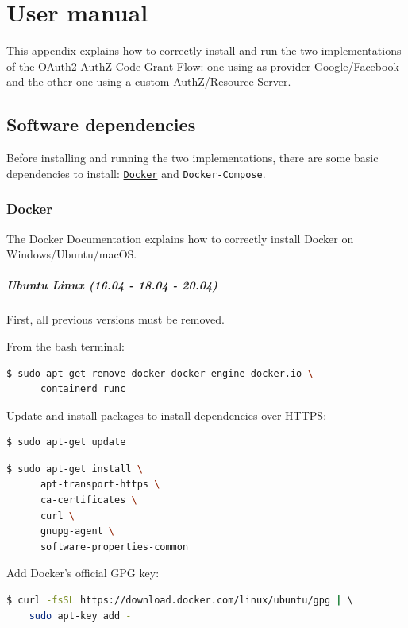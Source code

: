 \appendix
\chapter{User manual}
This appendix explains how to correctly install and run the two implementations of the OAuth2 AuthZ Code Grant Flow: one using as provider Google/Facebook and the other one using a custom AuthZ/Resource Server.

\minitoc

\section{Software dependencies}
\label{appa}
Before installing and running the two implementations, there are some basic dependencies to install: \href{https://www.docker.com/}{\texttt{Docker}} and \texttt{Docker-Compose}.

\subsection{Docker}
\label{ublin}
The Docker Documentation \cite{docker} explains how to correctly install Docker on Windows/Ubuntu/macOS.

\paragraph{Ubuntu Linux (16.04 - 18.04 - 20.04)} First, all previous versions must be removed. 

\noindent From the bash terminal:
\begin{lstlisting}[language=bash]
  $ sudo apt-get remove docker docker-engine docker.io \
      containerd runc
\end{lstlisting}

\noindent Update and install packages to install dependencies over HTTPS:
\begin{lstlisting}[language=bash]
  $ sudo apt-get update
\end{lstlisting}

\vspace{1.0cm}

\begin{lstlisting}[language=bash]
  $ sudo apt-get install \
      apt-transport-https \
      ca-certificates \
      curl \
      gnupg-agent \
      software-properties-common
\end{lstlisting}

\noindent Add Docker’s official GPG key:
\begin{lstlisting}[language=bash, showstringspaces=false, basicstyle=\ttfamily]
  $ curl -fsSL https://download.docker.com/linux/ubuntu/gpg | \ 
    sudo apt-key add -
\end{lstlisting}

